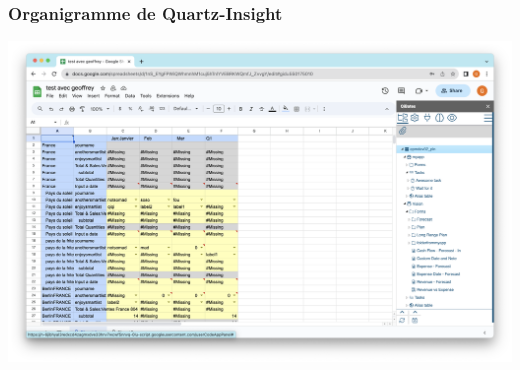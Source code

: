 \documentclass[aspectratio=169]{beamer}
\begin{document}
\begin{frame}
    \frametitle{Organigramme de Quartz-Insight}
    \includegraphics[height=0.75\textheight, center]{Imgs/qibates.png}
\end{frame}
\end{document}
